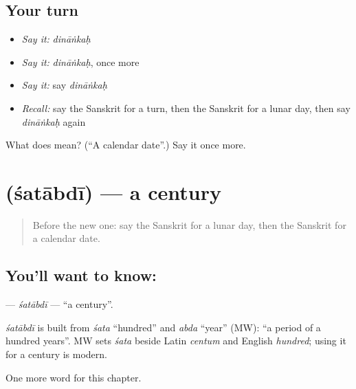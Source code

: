 \subsection*{Your turn}
\begin{itemize}
\raggedright
  \item \emph{Say it:} \emph{dināṅkaḥ}
  \item \emph{Say it:} \emph{dināṅkaḥ}, once more
  \item \emph{Say it:} say \emph{dināṅkaḥ}
  \item \emph{Recall:} say the Sanskrit for a turn, then the Sanskrit for a lunar day, then say \emph{dināṅkaḥ} again
\end{itemize}

\begin{tcolorbox}[breakable,colback=teal!4,colframe=teal!35!black,title={Before you move on}]
What does  mean? (\textquotedblleft{}A calendar date\textquotedblright{}.) Say it once more.
\end{tcolorbox}
\section[\texorpdfstring{\sk{शताब्दी} (śatābdī)}{शताब्दी (śatābdī)}]{ (śatābdī) — a century}

\label{lesson:SA-C152-satabdi}



\begin{quote}
Before the new one: say the Sanskrit for a lunar day, then the Sanskrit for a calendar date.
\end{quote}

\subsection*{You'll want to know: }
\textbf{} — \emph{śatābdī} — \textquotedblleft{}a century\textquotedblright{}.

\begin{cousinweb}
\emph{śatābdī} is built from \emph{śata} \textquotedblleft{}hundred\textquotedblright{} and \emph{abda} \textquotedblleft{}year\textquotedblright{} (MW): \textquotedblleft{}a period of a hundred years\textquotedblright{}. MW sets \emph{śata} beside Latin \emph{centum} and English \emph{hundred}; using it for a century is modern.
\end{cousinweb}

\begin{grammarlens}[title={What you've built}]
One more word for this chapter.
\end{grammarlens}

